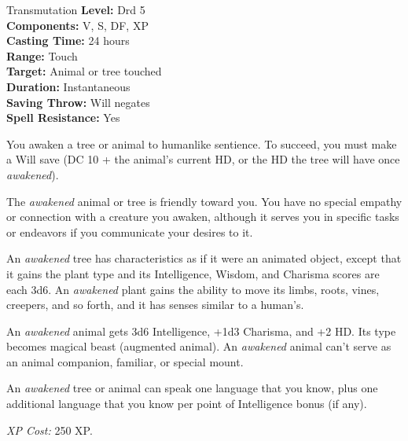 {Transmutation}
{
	\textbf{Level:}
	Drd 5\\
	\textbf{Components:}
	V, S, DF, XP\\
	\textbf{Casting Time:}
	24 hours\\
	\textbf{Range:}
	Touch\\
	\textbf{Target:}
	Animal or tree touched\\
	\textbf{Duration:}
	Instantaneous\\
	\textbf{Saving Throw:}
	Will negates\\
	\textbf{Spell Resistance:}
	Yes\\
}
{
	You awaken a tree or animal to humanlike sentience. To succeed, you must make a Will save (DC 10 + the animal's current HD, or the HD the tree will have once \emph{awakened}).

	The \emph{awakened} animal or tree is friendly toward you. You have no special empathy or connection with a creature you awaken, although it serves you in specific tasks or endeavors if you communicate your desires to it.

	An \emph{awakened} tree has characteristics as if it were an animated object, except that it gains the plant type and its Intelligence, Wisdom, and Charisma scores are each 3d6. An \emph{awakened} plant gains the ability to move its limbs, roots, vines, creepers, and so forth, and it has senses similar to a human's.

	An \emph{awakened} animal gets 3d6 Intelligence, +1d3 Charisma, and +2 HD. Its type becomes magical beast (augmented animal). An \emph{awakened} animal can't serve as an animal companion, familiar, or special mount.

	An \emph{awakened} tree or animal can speak one language that you know, plus one additional language that you know per point of Intelligence bonus (if any).

	\textit{XP Cost:}
	250 XP.

}

